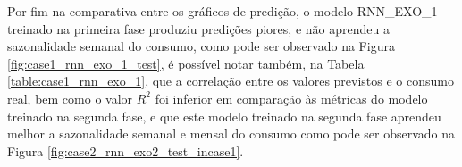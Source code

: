                 \begin{figure}[H]
                        \end{figure}        
        


     \begin{figure}[H]
                \end{figure}        Por fim na comparativa entre os gráficos de predição, o modelo RNN\_EXO\_1 treinado na primeira fase produziu predições piores, e não aprendeu a sazonalidade semanal do consumo, como pode ser observado na Figura \ref{fig:case1_rnn_exo_1_test}, é possível notar também, na Tabela  \ref{table:case1_rnn_exo_1}, que a correlação entre os valores previstos e o consumo real, bem como o valor $R^2$ foi inferior em comparação às métricas do modelo treinado na segunda fase, e que este modelo treinado na segunda fase aprendeu melhor a sazonalidade semanal e mensal do consumo como pode ser observado na Figura \ref{fig:case2_rnn_exo2_test_incase1}.
      
